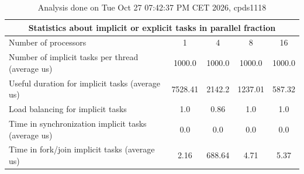 \begin{table}[h]
\begin{center}
\begin{tabular}{|l|c|c|c|c|}
\hline
\multicolumn{5}{|c|}{Statistics about implicit or explicit tasks in parallel fraction} \\
\hline
\hline
Number of processors & 1 & 4 & 8 & 16 \\
\hline
\hline
Number of implicit tasks per thread (average us)    &          1000.0 &          1000.0 &          1000.0 &          1000.0 \\
\hline
Useful duration for implicit tasks (average us)     &         7528.41 &          2142.2 &         1237.01 &          587.32 \\
\hline
Load balancing for implicit tasks                &             1.0 &            0.86 &             1.0 &             1.0 \\
\hline
Time in synchronization implicit tasks (average us) &             0.0 &             0.0 &             0.0 &             0.0 \\
\hline
Time in fork/join implicit tasks (average us)       &            2.16 &          688.64 &            4.71 &            5.37 \\
\hline
\end{tabular}
\end{center}
\caption{ Analysis done on Tue Oct 27 07:42:37 PM CET 2026, cpds1118}
\end{table}
